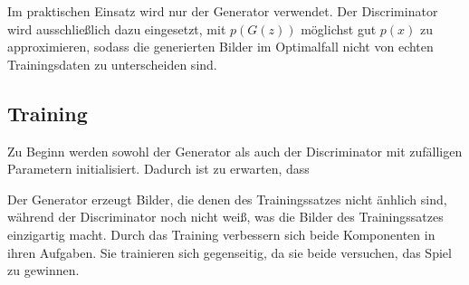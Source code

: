 Im praktischen Einsatz wird nur der Generator verwendet. Der Discriminator wird ausschließlich dazu eingesetzt, mit $p(G(z))$ möglichst gut $p(x)$ zu approximieren, sodass die generierten Bilder im Optimalfall nicht von echten Trainingsdaten zu unterscheiden sind.




\subsection{Training}
Zu Beginn werden sowohl der Generator als auch der Discriminator mit zufälligen Parametern initialisiert. Dadurch ist zu erwarten, dass 


Der Generator erzeugt Bilder, die denen des Trainingssatzes nicht änhlich sind, während der Discriminator noch nicht weiß, was die Bilder des Trainingssatzes einzigartig macht. Durch das Training verbessern sich beide Komponenten in ihren Aufgaben. Sie trainieren sich gegenseitig, da sie beide versuchen, das Spiel zu gewinnen.

